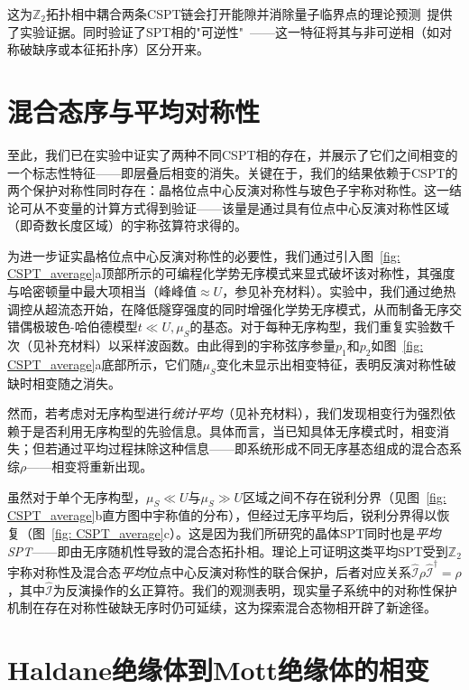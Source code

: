 \documentclass[preprint,superscriptaddress,floatfix,nofootinbib]{revtex4-2}
\begin{document}
这为$\mathbb{Z}_2$拓扑相中耦合两条CSPT链会打开能隙并消除量子临界点的理论预测~\cite{Gu2009}提供了实验证据。同时验证了SPT相的"可逆性"~\cite{Freed2014}——这一特征将其与非可逆相（如对称破缺序或本征拓扑序）区分开来。
\section{混合态序与平均对称性}

至此，我们已在实验中证实了两种不同CSPT相的存在，并展示了它们之间相变的一个标志性特征——即层叠后相变的消失。关键在于，我们的结果依赖于CSPT的两个保护对称性同时存在：晶格位点中心反演对称性与玻色子宇称对称性。这一结论可从不变量的计算方式得到验证——该量是通过具有位点中心反演对称性区域（即奇数长度区域）的宇称弦算符求得的。

为进一步证实晶格位点中心反演对称性的必要性，我们通过引入图~\ref{fig: CSPT_average}a顶部所示的可编程化学势无序模式来显式破坏该对称性，其强度与哈密顿量中最大项相当（峰峰值$\approx U$，参见补充材料）。实验中，我们通过绝热调控从超流态开始，在降低隧穿强度的同时增强化学势无序模式，从而制备无序交错偶极玻色-哈伯德模型$t \ll U, \mu_S$的基态。对于每种无序构型，我们重复实验数千次（见补充材料）以采样波函数。由此得到的宇称弦序参量$p_1$和$p_2$如图~\ref{fig: CSPT_average}a底部所示，它们随$\mu_S$变化未显示出相变特征，表明反演对称性破缺时相变随之消失。

然而，若考虑对无序构型进行\textit{统计平均}（见补充材料），我们发现相变行为强烈依赖于是否利用无序构型的先验信息。具体而言，当已知具体无序模式时，相变消失；但若通过平均过程抹除这种信息——即系统形成不同无序基态组成的混合态系综$\rho$——相变将重新出现\cite{Ma2023}。

虽然对于单个无序构型，$\mu_S \ll U$与$\mu_S \gg U$区域之间不存在锐利分界（见图~\ref{fig: CSPT_average}b直方图中宇称值的分布），但经过无序平均后，锐利分界得以恢复（图~\ref{fig: CSPT_average}c）。这是因为我们所研究的晶体SPT同时也是\textit{平均SPT}——即由无序随机性导致的混合态拓扑相\cite{Fu2012, Ringel12, Mong12, Fulga14, Ma2023, Ma23_b, De2022, Coser2019, Fan2024, Bao2023, Verstraete2009, Diehl2008, Sang2024, Sang2025}。理论上可证明这类平均SPT受到$\mathbb{Z}_2$宇称对称性及混合态\textit{平均}位点中心反演对称性的联合保护，后者对应关系$\hat{\mathcal{I}} \rho \hat{\mathcal{I}}^{\dagger} = \rho$，其中$\hat{\mathcal{I}}$为反演操作的幺正算符。我们的观测表明，现实量子系统中的对称性保护机制在存在对称性破缺无序时仍可延续，这为探索混合态物相开辟了新途径。
\section{Haldane绝缘体到Mott绝缘体的相变 \label{sec:HI}}
\end{document}

